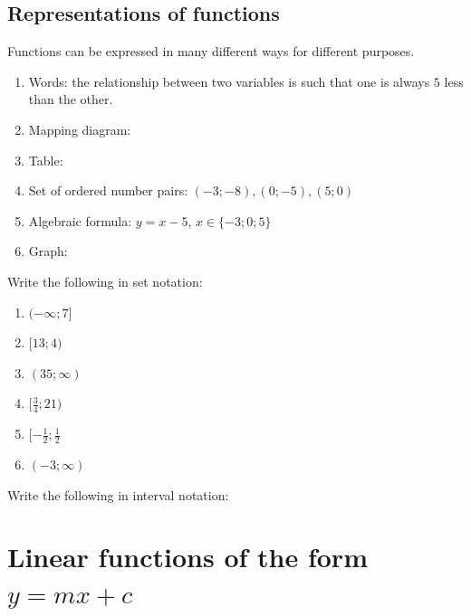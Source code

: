 \subsection*{Representations of functions}
Functions can be expressed in many different ways for different purposes. 
\begin{enumerate}[noitemsep, label=\textbf{\arabic*}. ] 
 \item Words: the relationship between two variables is such that one is always $5$ less than the other.
\item Mapping diagram: 
\item Table: 
\item Set of ordered number pairs: $(-3;-8), (0;-5), (5;0)$
\item Algebraic formula: $y = x-5$, $x \in \{-3; 0; 5\}$
\item Graph:

\end{enumerate}

\begin{exercises}{}
{
Write the following in set notation:
\begin{enumerate}[noitemsep, label=\textbf{\arabic*}. ] 
 \item $(- \infty; 7]$
\item $[13;4)$
\item $(35; \infty)$
\item $[\frac{3}{4}; 21)$
\item $[-\frac{1}{2}; \frac{1}{2}$
\item $(-3; \infty)$
\end{enumerate}

Write the following in interval notation:
\begin{enumerate}[noitemsep, label=\textbf{\arabic*}. ] 
\setcounter{enumi}{6}
 \item $\{p: p \in \mathBB{R}, p \leq 6\}$
 \item $\{k: k \in \mathBB{R}, -5 < k < 5}$
 \item $\{x: x \in \mathBB{R}, x > \frac{1}{5}\}$
 \item $\{z: z \in \mathBB{R}, 21 \leq z < 41\}$

\end{enumerate}

} 
\end{exercises}

\section{Linear functions of the form $y=mx+c$}


